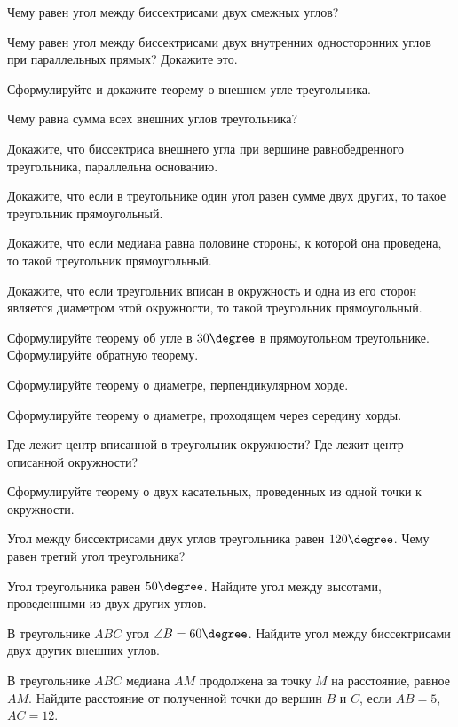 \begin{listofex}
	\item Чему равен угол между биссектрисами двух смежных углов?
	\item Чему равен угол между биссектрисами двух внутренних односторонних углов при параллельных прямых? Докажите это.
	\item Сформулируйте и докажите теорему о внешнем угле треугольника.
	\item Чему равна сумма всех внешних углов треугольника?
	\item Докажите, что биссектриса внешнего угла при вершине равнобедренного треугольника, параллельна основанию.
	\item Докажите, что если в треугольнике один угол равен сумме двух других, то такое треугольник прямоугольный.
	\item Докажите, что если медиана равна половине стороны, к которой она проведена, то такой треугольник прямоугольный.
	\item Докажите, что если треугольник вписан в окружность и одна из его сторон является диаметром этой окружности, то такой треугольник прямоугольный.
	\item Сформулируйте теорему об угле в \( 30\degree \) в прямоугольном треугольнике. Сформулируйте обратную теорему.
	\item Сформулируйте теорему о диаметре, перпендикулярном хорде.
	\item Сформулируйте теорему о диаметре, проходящем через середину хорды.
	\item Где лежит центр вписанной в треугольник окружности? Где лежит центр описанной окружности?
	\item Сформулируйте теорему о двух касательных, проведенных из одной точки к окружности.
	\item {}
	\item Угол между биссектрисами двух углов треугольника равен \( 120\degree \). Чему равен третий угол треугольника?
	\item Угол треугольника равен \( 50\degree \). Найдите угол между высотами, проведенными из двух других углов.
	\item В треугольнике \( ABC \) угол \( \angle B=60\degree \). Найдите угол между биссектрисами двух других внешних углов.
	\item {}
	\item {}
	\item {}
	\item {}
	\item {}
	\item {}
	\item {}
	\item В треугольнике \( ABC \) медиана \( AM \) продолжена за точку \( M \) на расстояние, равное \( AM \). Найдите расстояние от полученной точки до вершин \( B  \) и \( C\), если \( AB = 5\), \( AC = 12\).
	\item {}
	\item {}
	\item {}
\end{listofex}

